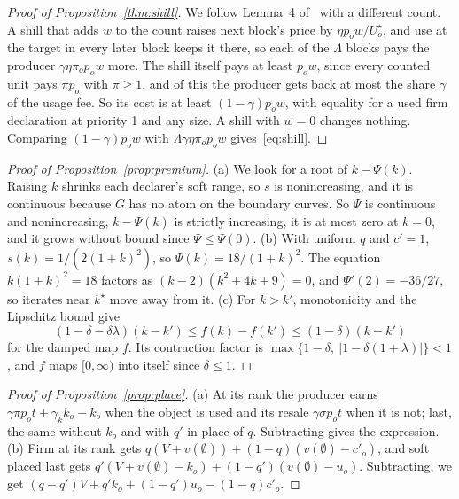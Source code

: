 \documentclass[conference,compsoc]{IEEEtran}
\numberwithin{equation}{section}
\theoremstyle{plain}
\theoremstyle{definition}
\theoremstyle{remark}
\newcommand{\cp}{c'}
\begin{document}
\begin{proof}[Proof of Proposition~\ref{thm:shill}]
We follow Lemma~4 of~\cite{wadhwa2026perils} with a different count. A shill that adds $w$ to the count raises next block's price by $\eta p_o w/U^\star_o$, and use at the target in every later block keeps it there, so each of the $\Lambda$ blocks pays the producer $\gamma \eta \pi_o p_o w$ more. The shill itself pays at least $p_o w$, since every counted unit pays $\pi p_o$ with $\pi \ge 1$, and of this the producer gets back at most the share $\gamma$ of the usage fee. So its cost is at least $(1-\gamma) p_o w$, with equality for a used firm declaration at priority 1 and any size. A shill with $w = 0$ changes nothing. Comparing $(1-\gamma) p_o w$ with $\Lambda\gamma\eta\pi_o p_o w$ gives~\eqref{eq:shill}.
\end{proof}

\begin{proof}[Proof of Proposition~\ref{prop:premium}]
(a) We look for a root of $k - \Psi(k)$. Raising $k$ shrinks each declarer's soft range, so $s$ is nonincreasing, and it is continuous because $G$ has no atom on the boundary curves. So $\Psi$ is continuous and nonincreasing, $k - \Psi(k)$ is strictly increasing, it is at most zero at $k = 0$, and it grows without bound since $\Psi \le \Psi(0)$. (b) With uniform $q$ and $\cp = 1$, $s(k) = 1/(2(1+k)^2)$, so $\Psi(k) = 18/(1+k)^2$. The equation $k(1+k)^2 = 18$ factors as $(k-2)(k^2+4k+9) = 0$, and $\Psi'(2) = -36/27$, so iterates near $k^\star$ move away from it. (c) For $k > k'$, monotonicity and the Lipschitz bound give
\begin{equation*}
(1 - \delta - \delta\lambda)(k - k') \le f(k) - f(k') \le (1-\delta)(k - k')
\end{equation*}
for the damped map $f$. Its contraction factor is $\max\{1-\delta,\ |1-\delta(1+\lambda)|\} < 1$, and $f$ maps $[0,\infty)$ into itself since $\delta \le 1$.
\end{proof}

\begin{proof}[Proof of Proposition~\ref{prop:place}]
(a) At its rank the producer earns $\gamma\pi p_o t + \gamma_k k_o - k_o$ when the object is used and its resale $\gamma\sigma p_o t$ when it is not; last, the same without $k_o$ and with $q'$ in place of $q$. Subtracting gives the expression. (b) Firm at its rank gets $q(V + v(\emptyset)) + (1-q)(v(\emptyset) - \cp_o)$, and soft placed last gets $q'(V + v(\emptyset) - k_o) + (1-q')(v(\emptyset) - u_o)$. Subtracting, we get $(q - q')V + q' k_o + (1 - q')u_o - (1-q)\cp_o$.
\end{proof}
\end{document}
